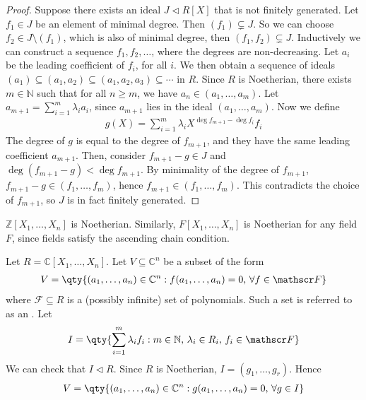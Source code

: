 \begin{proof}
	Suppose there exists an ideal $J \triangleleft R[X]$ that is not finitely generated.
	Let $f_1 \in J$ be an element of minimal degree.
	Then $(f_1) \subsetneq J$.
	So we can choose $f_2 \in J \setminus (f_1)$, which is also of minimal degree, then $(f_1, f_2) \subsetneq J$.
	Inductively we can construct a sequence $f_1, f_2, \dots$, where the degrees are non-decreasing.
	Let $a_i$ be the leading coefficient of $f_i$, for all $i$.
	We then obtain a sequence of ideals $(a_1) \subseteq (a_1, a_2) \subseteq (a_1, a_2, a_3) \subseteq \cdots$ in $R$.
	Since $R$ is Noetherian, there exists $m \in \mathbb N$ such that for all $n \geq m$, we have $a_{n} \in (a_1, \dots, a_m)$.
	Let $a_{m+1} = \sum_{i=1}^m \lambda_i a_i$, since $a_{m+1}$ lies in the ideal $(a_1, \dots, a_m)$.
	Now we define
	\begin{align*}
		g(X) = \sum_{i=1}^m \lambda_i X^{\deg f_{m+1} - \deg f_i} f_i
	\end{align*}
	The degree of $g$ is equal to the degree of $f_{m+1}$, and they have the same leading coefficient $a_{m+1}$.
	Then, consider $f_{m+1} - g \in J$ and $\deg (f_{m+1} - g) < \deg f_{m+1}$.
	By minimality of the degree of $f_{m+1}$, $f_{m+1} - g \in (f_1, \dots, f_m)$, hence $f_{m+1} \in (f_1, \dots, f_m)$.
	This contradicts the choice of $f_{m+1}$, so $J$ is in fact finitely generated.
\end{proof}

\begin{corollary}
	$\mathbb Z[X_1, \dots, X_n]$ is Noetherian.
	Similarly, $F[X_1, \dots, X_n]$ is Noetherian for any field $F$, since fields satisfy the ascending chain condition.
\end{corollary}

\begin{example}
	Let $R = \mathbb C[X_1, \dots, X_n]$.
	Let $V \subseteq \mathbb C^n$ be a subset of the form
	\begin{align*}
		V = \qty{(a_1, \dots, a_n) \in \mathbb C^n : f(a_1, \dots, a_n) = 0,\,\forall f \in \mathscr F}
	\end{align*}
	where $\mathscr F \subseteq R$ is a (possibly infinite) set of polynomials.
	Such a set is referred to as an .
	Let
	\begin{align*}
		I = \qty{\sum_{i=1}^m \lambda_i f_i : m \in \mathbb N,\, \lambda_i \in R_i,\, f_i \in \mathscr F}
	\end{align*}
	We can check that $I \triangleleft R$.
	Since $R$ is Noetherian, $I = (g_1, \dots, g_r)$.
	Hence
	\begin{align*}
		V = \qty{(a_1, \dots, a_n) \in \mathbb C^n : g(a_1, \dots, a_n) = 0,\,\forall g \in I}
	\end{align*}
\end{example}

